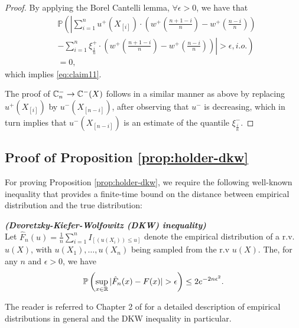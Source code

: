 \begin{proof}
By applying the Borel Cantelli lemma,  $\forall \epsilon >0$, we have that
\begin{align*}
&\mathbb{P} \left( \left| \sum_{i=1}^{n} u^+\left(X_{[i]}\right) \cdot \left(w^+\left(\frac{n+1-i}{n} \right)  - w^+\left(\frac{n-i}{n} \right) \right)\right.\right. \\
&\left.\left.-
\sum_{i=1}^{n} \xi^+_{\frac{i}{n}} \cdot \left(w^+\left(\frac{n+1-i}{n} \right)  - w^+\left(\frac{n-i}{n} \right) \right) \right| >
\epsilon , i.o.\right) \\
&=0, 
\end{align*}
which implies  \eqref{eq:claim11}. 

The proof of 
$\mathbb{C}_{n}^{-} \rightarrow \mathbb{C}^{-}(X)$ follows in a similar manner as above by replacing $u^+(X_{[i]})$ by $u^-(X_{[n-i]})$, after observing that $u^{-}$ is decreasing, which in turn implies that
$u^-(X_{[n-i]})$ is an estimate of the quantile $\xi^{-}_{\frac{i}{n}}$.
\end{proof}

\subsection*{Proof of Proposition \ref{prop:holder-dkw}}
For proving Proposition \ref{prop:holder-dkw}, we require the following well-known inequality that provides a finite-time bound on the distance between empirical distribution and the true distribution:
\begin{lemma}{\textbf{\textit{(Dvoretzky-Kiefer-Wolfowitz (DKW) inequality)}}}\\
Let ${\hat F_n}(u)=\frac{1}{n} \sum_{i=1}^n I_{\left[(u(X_i)) \leq u\right]}$ denote the empirical distribution of a r.v. $u(X)$, with $u(X_1),\ldots,u(X_n)$ being sampled from the r.v $u(X)$.
The, for any $n$ and $\epsilon>0$, we have
$$
\Prob{\sup_{x\in \mathbb{R}}|\hat{F}_n(x)-F(x)|>\epsilon } \leq 2 e^{-2n\epsilon^2}.
$$
\end{lemma}

The reader is referred to Chapter 2 of \cite{wasserman2006} for a detailed description of empirical distributions in general and the DKW inequality in particular.


